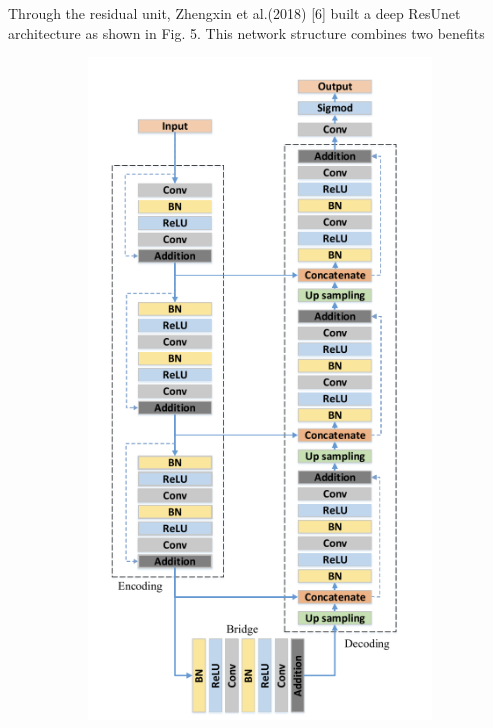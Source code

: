 \documentclass[conference]{IEEEtran}
\begin{document}
Through the residual unit, Zhengxin et al.(2018) [6] built a deep ResUnet architecture as shown in Fig. 5. This network structure combines two benefits 
\begin{figure}[h]
    \centering
    \begin{subfigure}[t]{0.2\textwidth}
        \centering
        \includegraphics[width=\textwidth]{group/Picture6.png}

\end{subfigure}
\end{figure}
\end{document}
